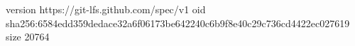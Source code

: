 version https://git-lfs.github.com/spec/v1
oid sha256:6584edd359dedace32a6f06173be642240c6b9f8e40c29c736cd4422ec027619
size 20764
